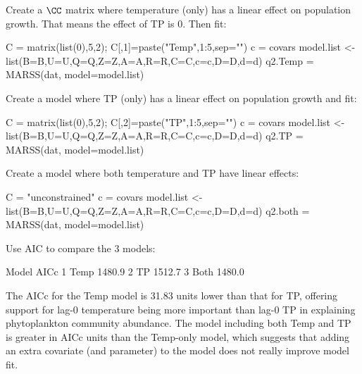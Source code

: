 Create a $\CC$ matrix where temperature (only) has a linear effect on population growth.  That means the effect of TP is 0.  Then fit:
\begin{Schunk}
\begin{Sinput}
 C = matrix(list(0),5,2); C[,1]=paste("Temp",1:5,sep="")
 c = covars                        
 model.list <- list(B=B,U=U,Q=Q,Z=Z,A=A,R=R,C=C,c=c,D=D,d=d)
 q2.Temp = MARSS(dat, model=model.list)
\end{Sinput}
\end{Schunk}
Create a model where TP (only) has a linear effect on population growth and fit:
\begin{Schunk}
\begin{Sinput}
 C = matrix(list(0),5,2); C[,2]=paste("TP",1:5,sep="")
 c = covars                        
 model.list <- list(B=B,U=U,Q=Q,Z=Z,A=A,R=R,C=C,c=c,D=D,d=d)
 q2.TP = MARSS(dat, model=model.list)
\end{Sinput}
\end{Schunk}
Create a model where both temperature and TP have linear effects:
\begin{Schunk}
\begin{Sinput}
 C = "unconstrained"
 c = covars                        
 model.list <- list(B=B,U=U,Q=Q,Z=Z,A=A,R=R,C=C,c=c,D=D,d=d)
 q2.both = MARSS(dat, model=model.list)
\end{Sinput}
\end{Schunk}
Use AIC to compare the 3 models:
\begin{Schunk}
\begin{Soutput}
  Model   AICc
1  Temp 1480.9
2    TP 1512.7
3  Both 1480.0
\end{Soutput}
\end{Schunk}
The AICc for the Temp model is 31.83 units lower than that for TP, offering
support for lag-0 temperature being more important than lag-0 TP in explaining
phytoplankton community abundance. The model including both Temp and TP
is greater in AICc units than the Temp-only model, which suggests
that adding an extra covariate (and parameter) to the model does not really
improve model fit. 

